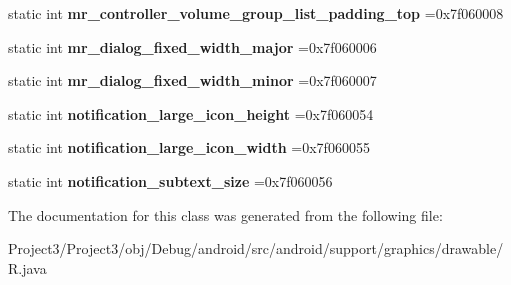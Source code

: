 \begin{DoxyCompactItemize}
\item 
\mbox{\label{classandroid_1_1support_1_1graphics_1_1drawable_1_1R_1_1dimen_ab0cc5b5e67079d037856034fb10eb6c6}} 
static int {\bfseries mr\+\_\+controller\+\_\+volume\+\_\+group\+\_\+list\+\_\+padding\+\_\+top} =0x7f060008
\item 
\mbox{\label{classandroid_1_1support_1_1graphics_1_1drawable_1_1R_1_1dimen_a891efef258a9c387f387be18692a17c7}} 
static int {\bfseries mr\+\_\+dialog\+\_\+fixed\+\_\+width\+\_\+major} =0x7f060006
\item 
\mbox{\label{classandroid_1_1support_1_1graphics_1_1drawable_1_1R_1_1dimen_ac9556278c3e5262569bc2ce72cfc6de0}} 
static int {\bfseries mr\+\_\+dialog\+\_\+fixed\+\_\+width\+\_\+minor} =0x7f060007
\item 
\mbox{\label{classandroid_1_1support_1_1graphics_1_1drawable_1_1R_1_1dimen_abb0ecb67003972e39f6a9f4851c52b5b}} 
static int {\bfseries notification\+\_\+large\+\_\+icon\+\_\+height} =0x7f060054
\item 
\mbox{\label{classandroid_1_1support_1_1graphics_1_1drawable_1_1R_1_1dimen_a36a682e868370fe290e06052fba526f1}} 
static int {\bfseries notification\+\_\+large\+\_\+icon\+\_\+width} =0x7f060055
\item 
\mbox{\label{classandroid_1_1support_1_1graphics_1_1drawable_1_1R_1_1dimen_a0f50e467dd58df27016a8a8aee659606}} 
static int {\bfseries notification\+\_\+subtext\+\_\+size} =0x7f060056
\end{DoxyCompactItemize}


The documentation for this class was generated from the following file\+:\begin{DoxyCompactItemize}
\item 
Project3/\+Project3/obj/\+Debug/android/src/android/support/graphics/drawable/R.\+java\end{DoxyCompactItemize}
